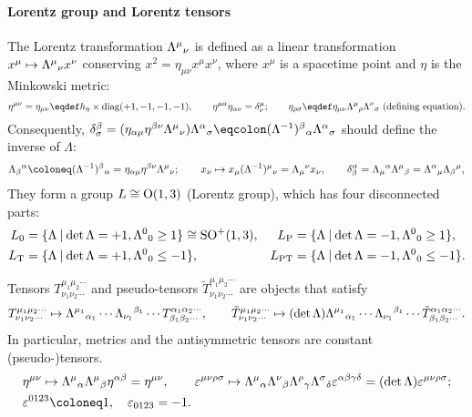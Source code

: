 \documentclass[CheatSheet]{subfiles}
\begin{document}
\paragraph{Lorentz group and Lorentz tensors}
The Lorentz transformation $\Lambda^{\mu}{}_{\nu}$ is defined as a linear transformation $x^\mu\mapsto\Lambda^{\mu}{}_{\nu} x^\nu$ conserving $x^2=\eta_{\mu\nu}x^\mu x^\nu$, where $x^\mu$ is a spacetime point and $\eta$ is the Minkowski metric:
\begin{equation}
 \eta^{\mu\nu}=\eta_{\mu\nu}\eqdef h_\eta\times\diag(+1,-1,-1,-1),\qquad
 \eta^{\mu\alpha}\eta_{\alpha\nu}=\delta^{\mu}_\nu;\qquad
 \eta_{\rho\sigma}\eqdef\eta_{\mu\nu}\LorTr\mu\rho\LorTr\nu\sigma ~\text{(defining equation)}.
\label{eq:LorTr}
\end{equation}
Consequently, $
  \delta^\beta_\sigma
  = (\eta_{\alpha\mu}\eta^{\beta\nu}\LorTr\mu\nu)\LorTr\alpha\sigma
  \eqcolon (\Lambda^{-1})^\beta{}_\alpha\LorTr\alpha\sigma$
should define the inverse of $\Lambda$:
\begin{equation}
  \Lambda_\beta{}^\alpha
  \deq (\Lambda^{-1})^\beta{}_\alpha
  = \eta_{\alpha\mu}\eta^{\beta\nu}\LorTr\mu\nu;
  \qquad
  x_\nu
  \mapsto x_\mu(\Lambda^{-1})^\mu{}_\nu
  =\Lambda_\mu{}^\nu x_\nu,\qquad
  \delta^\alpha_\beta
  =\Lambda_\mu{}^\alpha\LorTr\mu\beta
  =\LorTr\alpha\mu \Lambda_\beta{}^\mu,
\end{equation}
They form a group $L\cong\operatorname{\mathrm O}(1,3)$ (Lorentz group), which has four disconnected parts:
\begin{align}
 L\w 0  &=\{\Lambda\mathbin|\det\Lambda=+1, \LorTr00\ge1\}\cong \mathop{\mathrm{SO^+}}(1,3),&
 L\w P  &=\{\Lambda\mathbin|\det\Lambda=-1, \LorTr00\ge1\},\notag\\
 L\w T  &=\{\Lambda\mathbin|\det\Lambda=+1, \LorTr00\le-1\},&
 L\w{PT}&=\{\Lambda\mathbin|\det\Lambda=-1, \LorTr00\le-1\}.
\label{eq:lorentz4parts}
\end{align}

Tensors $T^{\mu_1\mu_2\cdots}_{\nu_1\nu_2\cdots}$ and pseudo-tensors $\tilde T^{\mu_1\mu_2\cdots}_{\nu_1\nu_2\cdots}$ are objects that satisfy
\begin{equation}
 T^{\mu_1\mu_2\cdots}_{\nu_1\nu_2\cdots}\mapsto
\Lambda^{\mu_1}{}_{\alpha_1}\cdots
\Lambda_{\nu_1}{}^{\beta_1}\cdots
 T^{\alpha_1\alpha_2\cdots}_{\beta_1\beta_2\cdots},
\qquad
 \tilde T^{\mu_1\mu_2\cdots}_{\nu_1\nu_2\cdots}\mapsto(\det\Lambda)
\Lambda^{\mu_1}{}_{\alpha_1}\cdots
\Lambda_{\nu_1}{}^{\beta_1}\cdots
 \tilde T^{\alpha_1\alpha_2\cdots}_{\beta_1\beta_2\cdots}.
\end{equation}
In particular, metrics and the antisymmetric tensors are constant (pseudo-)tensors.
\begin{align}
&\eta^{\mu\nu}\mapsto \LorTr\mu\alpha\LorTr\mu\beta\eta^{\alpha\beta}=\eta^{\mu\nu},\qquad
 \vep^{\mu\nu\rho\sigma}\mapsto \LorTr\mu\alpha\LorTr\nu\beta\LorTr\rho\gamma\LorTr\sigma\delta\vep^{\alpha\beta\gamma\delta}=(\det\Lambda)\vep^{\mu\nu\rho\sigma};\\
&\vep^{0123}\deq1,\quad \vep_{0123}=-1.
\end{align}
\end{document}
